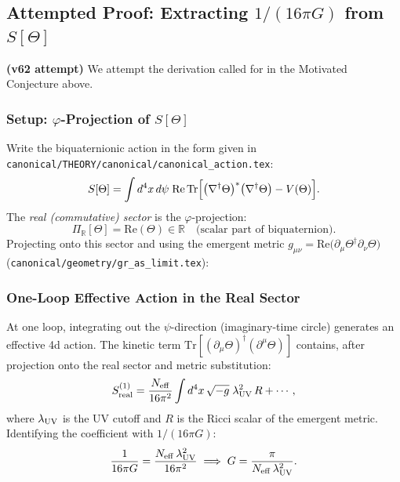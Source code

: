 \documentclass[12pt,a4paper]{article}
\theoremstyle{definition}
\theoremstyle{remark}
\begin{document}
\subsection{Attempted Proof: Extracting $1/(16\pi G)$ from $S[\Theta]$}
\label{subsec:attempted_proof}

\textbf{(v62 attempt)} We attempt the derivation called for in the
Motivated Conjecture above.

\subsubsection{Setup: $\varphi$-Projection of $S[\Theta]$}

Write the biquaternionic action in the form given in
\texttt{canonical/THEORY/canonical/canonical\_action.tex}:
\begin{equation}
  S[\Theta] = \int d^4x\,d\psi\;\mathrm{Re}\,\mathrm{Tr}\Bigl[
    \bigl(\nabla^\dagger\Theta\bigr)^*\bigl(\nabla^\dagger\Theta\bigr)
    - V(\Theta)
  \Bigr].
\end{equation}
The \emph{real (commutative) sector} is the $\varphi$-projection:
\begin{equation}
  \Pi_{\mathbb{R}}[\Theta] = \mathrm{Re}(\Theta) \in \mathbb{R}
  \quad \text{(scalar part of biquaternion)}.
\end{equation}
Projecting onto this sector and using the emergent metric
$g_{\mu\nu} = \mathrm{Re}\bigl(\partial_\mu\Theta^\dagger\partial_\nu\Theta\bigr)$
(\texttt{canonical/geometry/gr\_as\_limit.tex}):

\subsubsection{One-Loop Effective Action in the Real Sector}

At one loop, integrating out the $\psi$-direction (imaginary-time circle)
generates an effective 4d action.  The kinetic term
$\mathrm{Tr}[(\partial_\mu\Theta)^\dagger(\partial^\mu\Theta)]$ contains,
after projection onto the real sector and metric substitution:
\begin{equation}
  S^{(1)}_{\rm real} = \frac{N_{\rm eff}}{16\pi^2}
    \int d^4x\,\sqrt{-g}\;\lambda_{\rm UV}^2\,R + \cdots,
  \label{eq:one_loop_curvature}
\end{equation}
where $\lambda_{\rm UV}$ is the UV cutoff and $R$ is the Ricci scalar
of the emergent metric.  Identifying the coefficient with $1/(16\pi G)$:
\begin{equation}
  \frac{1}{16\pi G} = \frac{N_{\rm eff}\,\lambda_{\rm UV}^2}{16\pi^2}
  \implies G = \frac{\pi}{N_{\rm eff}\,\lambda_{\rm UV}^2}.
  \label{eq:G_from_cutoff}
\end{equation}
\end{document}
